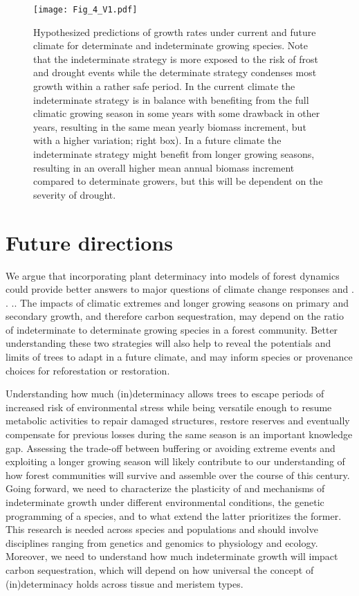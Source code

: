 \documentclass{article}
\begin{document}
	
								\begin{figure}
								\centering
								\texttt{[image: Fig\_4\_V1.pdf]} 
								\caption{Hypothesized predictions of growth rates under current and future climate for determinate and indeterminate growing species. Note that the indeterminate strategy is more exposed to the risk of frost and drought events while the determinate strategy condenses most growth within a rather safe period. In the current climate the indeterminate strategy is in balance with benefiting from the full climatic growing season in some years with some drawback in other years, resulting in the same mean yearly biomass increment, but with a higher variation; right box). In a future climate the indeterminate strategy might benefit from longer growing seasons, resulting in an overall higher mean annual biomass increment compared to determinate growers, but this will be dependent on the severity of drought.}
								\label{fig:fig_4xxx}
							\end{figure}
	\pagebreak
\section*{Future directions}
We argue that incorporating plant determinacy into models of forest dynamics could provide better answers to major questions of climate change responses and . . .. The impacts of climatic extremes and longer growing seasons on primary and secondary growth, and therefore carbon sequestration, may depend on the ratio of indeterminate to determinate growing species in a forest community. Better understanding these two strategies will also help to reveal the potentials and limits of trees to adapt in a future climate, and may inform species or provenance choices for reforestation or restoration.

Understanding how much (in)determinacy allows trees to escape periods of increased risk of environmental stress while being versatile enough to resume metabolic activities to repair damaged structures, restore reserves and eventually compensate for previous losses during the same season is an important knowledge gap. Assessing the trade-off between buffering or avoiding extreme events and exploiting a longer growing season will likely contribute to our understanding of how forest communities will survive and assemble over the course of this century.\\

Going forward, we need to characterize the plasticity of and mechanisms of indeterminate growth under different environmental conditions, the genetic programming of a species, and to what extend the latter prioritizes the former. This research is needed across species and populations and should involve disciplines ranging from genetics and genomics to physiology and ecology. Moreover, we need to understand how much indeterminate growth will impact carbon sequestration, which will depend on how universal the concept of (in)determinacy holds across tissue and meristem types.
\end{document}
